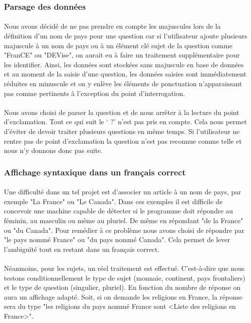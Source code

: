 \documentclass[11pt,a4paper]{article}
\begin{document}
\subsubsection{Parsage des données}

\paragraph{}Nous avons décidé de ne pas prendre en compte les majuscules lors de la définition d'un nom de pays pour une question car si l'utilisateur ajoute plusieurs majuscule à un nom de pays ou à un élément clé sujet de la question comme "FranCE" ou "DEVise", on aurait eu à faire un traitement supplémentaire pour les identifier. Ainsi, les données sont stockées sans majuscule en base de données et au moment de la saisie d'une question, les données saisies sont immédiatement réduites en minuscule et on y enlève les éléments de ponctuation n'apparaissant pas comme pertinents à l'exception du point d'interrogation. 
\paragraph{}Nous avons choisi de parser la question et de nous arrêter à la lecture du point d’exclamation. Tout ce qui suit le ‘ ?’ n’est pas pris en compte. Cela nous permet d’éviter de devoir traiter plusieurs questions en même temps. Si l’utilisateur ne rentre pas de point d’exclamation la question n’est pas reconnue comme telle et nous n’y donnons donc pas suite.

\subsubsection{Affichage syntaxique dans un français correct}

\paragraph{}Une difficulté dans un tel projet est d'associer un article à un nom de pays, par exemple "La France" ou "Le Canada". Dans ces exemples il est difficile de concevoir une machine capable de détecter si le programme doit répondre au féminin, au masculin ou même au pluriel. De même en répondant "de la France" ou "du Canada". Pour remédier à ce problème nous avons choisi de répondre par "le pays nommé France" ou "du pays nommé Canada". Cela permet de lever l'ambiguïté tout en restant dans un français correct. 
\paragraph{}Néanmoins, pour les sujets, un réel traitement est effectué. C'est-à-dire que nous testons conditionnellement le type de sujet (monnaie, continent, pays frontaliers) et le type de question (singulier, pluriel). En fonction du nombre de réponse on aura un affichage adapté. Soit, si on demande les religions en France, la réponse sera du type "les religions du pays nommé France sont <Liste des religions en France>". 
\end{document}
